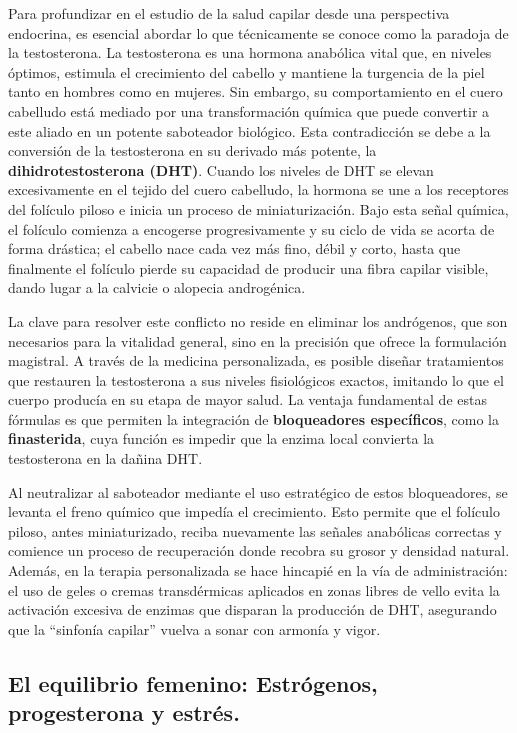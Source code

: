 \documentclass[
  spanish,
]{article}
\begin{document}
Para profundizar en el estudio de la salud capilar desde una perspectiva endocrina, es esencial abordar lo que técnicamente se conoce como la paradoja de la testosterona. La testosterona es una hormona anabólica vital que, en niveles óptimos, estimula el crecimiento del cabello y mantiene la turgencia de la piel tanto en hombres como en mujeres. Sin embargo, su comportamiento en el cuero cabelludo está mediado por una transformación química que puede convertir a este aliado en un potente saboteador biológico.
Esta contradicción se debe a la conversión de la testosterona en su derivado más potente, la \textbf{dihidrotestosterona (DHT)}. Cuando los niveles de DHT se elevan excesivamente en el tejido del cuero cabelludo, la hormona se une a los receptores del folículo piloso e inicia un proceso de miniaturización. Bajo esta señal química, el folículo comienza a encogerse progresivamente y su ciclo de vida se acorta de forma drástica; el cabello nace cada vez más fino, débil y corto, hasta que finalmente el folículo pierde su capacidad de producir una fibra capilar visible, dando lugar a la calvicie o alopecia androgénica.

La clave para resolver este conflicto no reside en eliminar los andrógenos, que son necesarios para la vitalidad general, sino en la precisión que ofrece la formulación magistral. A través de la medicina personalizada, es posible diseñar tratamientos que restauren la testosterona a sus niveles fisiológicos exactos, imitando lo que el cuerpo producía en su etapa de mayor salud. La ventaja fundamental de estas fórmulas es que permiten la integración de \textbf{bloqueadores específicos}, como la \textbf{finasterida}, cuya función es impedir que la enzima local convierta la testosterona en la dañina DHT.

Al neutralizar al saboteador mediante el uso estratégico de estos bloqueadores, se levanta el freno químico que impedía el crecimiento. Esto permite que el folículo piloso, antes miniaturizado, reciba nuevamente las señales anabólicas correctas y comience un proceso de recuperación donde recobra su grosor y densidad natural. Además, en la terapia personalizada se hace hincapié en la vía de administración: el uso de geles o cremas transdérmicas aplicados en zonas libres de vello evita la activación excesiva de enzimas que disparan la producción de DHT, asegurando que la ``sinfonía capilar'' vuelva a sonar con armonía y vigor.

\subsection{El equilibrio femenino: Estrógenos, progesterona y estrés.}\label{el-equilibrio-femenino-estruxf3genos-progesterona-y-estruxe9s.}
\end{document}
